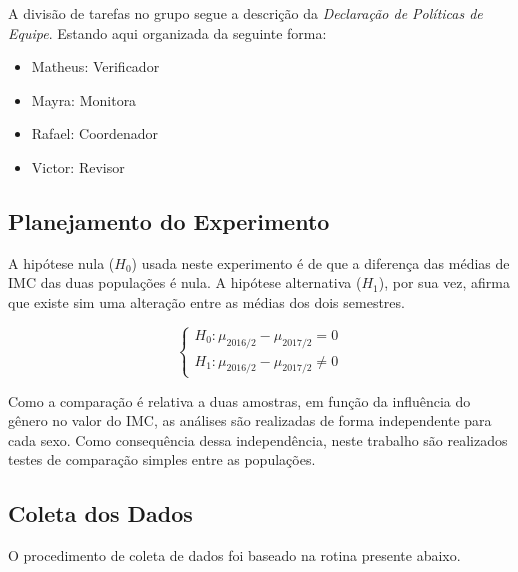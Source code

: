 \documentclass[]{article}
\providecommand{\tightlist}{%
  \setlength{\itemsep}{0pt}\setlength{\parskip}{0pt}}
\begin{document}
A divisão de tarefas no grupo segue a descrição da \emph{Declaração de
Políticas de Equipe}. Estando aqui organizada da seguinte forma:

\begin{itemize}
\tightlist
\item
  Matheus: Verificador
\item
  Mayra: Monitora
\item
  Rafael: Coordenador
\item
  Victor: Revisor
\end{itemize}

\hypertarget{planejamento-do-experimento}{%
\subsection{Planejamento do
Experimento}\label{planejamento-do-experimento}}

A hipótese nula (\(H_{0}\)) usada neste experimento é de que a diferença
das médias de IMC das duas populações é nula. A hipótese alternativa
(\(H_{1}\)), por sua vez, afirma que existe sim uma alteração entre as
médias dos dois semestres.

\[
\begin{cases}
  H_0: \mu_{2016/2} - \mu_{2017/2} = 0 \\
  H_1: \mu_{2016/2} - \mu_{2017/2} \neq 0
\end{cases}
\]

Como a comparação é relativa a duas amostras, em função da influência do
gênero no valor do IMC, as análises são realizadas de forma independente
para cada sexo. Como consequência dessa independência, neste trabalho
são realizados testes de comparação simples entre as populações.

\hypertarget{coleta-dos-dados}{%
\subsection{Coleta dos Dados}\label{coleta-dos-dados}}

O procedimento de coleta de dados foi baseado na rotina presente abaixo.
\end{document}
